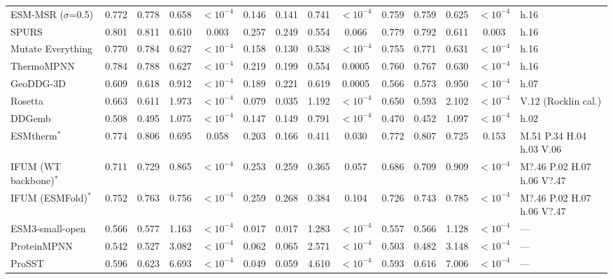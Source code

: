 \begin{table}[H]
{\begin{tabular}{lccccccccccccl}
ESM-MSR ($\sigma$=0.5) & 0.772 & 0.778 & 0.658 & $<10^{-4}$ & 0.146 & 0.141 & 0.741 & $<10^{-4}$ & 0.759 & 0.759 & 0.625 & $<10^{-4}$ & h.16 \\
SPURS & 0.801 & 0.811 & 0.610 & 0.003 & 0.257 & 0.249 & 0.554 & 0.066 & 0.779 & 0.792 & 0.611 & 0.003 & h.16 \\
Mutate Everything & 0.770 & 0.784 & 0.627 & $<10^{-4}$ & 0.158 & 0.130 & 0.538 & $<10^{-4}$ & 0.755 & 0.771 & 0.631 & $<10^{-4}$ & h.16 \\
ThermoMPNN & 0.784 & 0.788 & 0.627 & $<10^{-4}$ & 0.219 & 0.199 & 0.554 & 0.0005 & 0.760 & 0.767 & 0.630 & $<10^{-4}$ & h.16 \\
GeoDDG-3D & 0.609 & 0.618 & 0.912 & $<10^{-4}$ & 0.189 & 0.221 & 0.619 & 0.0005 & 0.566 & 0.573 & 0.950 & $<10^{-4}$ & h.07 \\
Rosetta & 0.663 & 0.611 & 1.973 & $<10^{-4}$ & 0.079 & 0.035 & 1.192 & $<10^{-4}$ & 0.650 & 0.593 & 2.102 & $<10^{-4}$ & V.12 (Rocklin cal.) \\
DDGemb & 0.508 & 0.495 & 1.075 & $<10^{-4}$ & 0.147 & 0.149 & 0.791 & $<10^{-4}$ & 0.470 & 0.452 & 1.097 & $<10^{-4}$ & h.02 \\
ESMtherm$^*$ & 0.774 & 0.806 & 0.695 & 0.058 & 0.203 & 0.166 & 0.411 & 0.030 & 0.772 & 0.807 & 0.725 & 0.153 & M.51 P.34 H.04 h.03 V.06 \\
IFUM (WT backbone)$^*$ & 0.711 & 0.729 & 0.865 & $<10^{-4}$ & 0.253 & 0.259 & 0.365 & 0.057 & 0.686 & 0.709 & 0.909 & $<10^{-4}$ & M?.46 P.02 H.07 h.06 V?.47 \\
IFUM (ESMFold)$^*$ & 0.752 & 0.763 & 0.756 & $<10^{-4}$ & 0.259 & 0.268 & 0.384 & 0.104 & 0.726 & 0.743 & 0.785 & $<10^{-4}$ & M?.46 P.02 H.07 h.06 V?.47 \\
ESM3-small-open & 0.566 & 0.577 & 1.163 & $<10^{-4}$ & 0.017 & 0.017 & 1.283 & $<10^{-4}$ & 0.557 & 0.566 & 1.128 & $<10^{-4}$ & --- \\
ProteinMPNN & 0.542 & 0.527 & 3.082 & $<10^{-4}$ & 0.062 & 0.065 & 2.571 & $<10^{-4}$ & 0.503 & 0.482 & 3.148 & $<10^{-4}$ & --- \\
ProSST & 0.596 & 0.623 & 6.693 & $<10^{-4}$ & 0.049 & 0.059 & 4.610 & $<10^{-4}$ & 0.593 & 0.616 & 7.006 & $<10^{-4}$ & --- \\
\bottomrule
\end{tabular}
}
\end{table}




